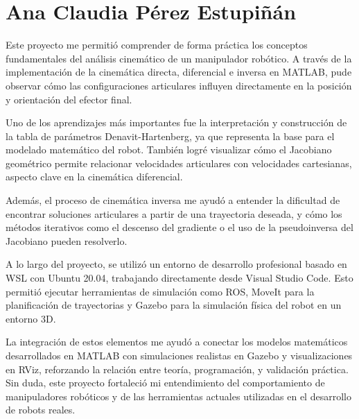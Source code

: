 \section{Ana Claudia Pérez Estupiñán}

Este proyecto me permitió comprender de forma práctica los conceptos fundamentales del análisis cinemático de un manipulador robótico. A través de la implementación de la cinemática directa, diferencial e inversa en MATLAB, pude observar cómo las configuraciones articulares influyen directamente en la posición y orientación del efector final.

Uno de los aprendizajes más importantes fue la interpretación y construcción de la tabla de parámetros Denavit-Hartenberg, ya que representa la base para el modelado matemático del robot. También logré visualizar cómo el Jacobiano geométrico permite relacionar velocidades articulares con velocidades cartesianas, aspecto clave en la cinemática diferencial.

Además, el proceso de cinemática inversa me ayudó a entender la dificultad de encontrar soluciones articulares a partir de una trayectoria deseada, y cómo los métodos iterativos como el descenso del gradiente o el uso de la pseudoinversa del Jacobiano pueden resolverlo.

A lo largo del proyecto, se utilizó un entorno de desarrollo profesional basado en WSL con Ubuntu 20.04, trabajando directamente desde Visual Studio Code. Esto permitió ejecutar herramientas de simulación como ROS, MoveIt para la planificación de trayectorias y Gazebo para la simulación física del robot en un entorno 3D.

La integración de estos elementos me ayudó a conectar los modelos matemáticos desarrollados en MATLAB con simulaciones realistas en Gazebo y visualizaciones en RViz, reforzando la relación entre teoría, programación, y validación práctica. Sin duda, este proyecto fortaleció mi entendimiento del comportamiento de manipuladores robóticos y de las herramientas actuales utilizadas en el desarrollo de robots reales.

